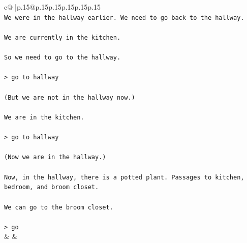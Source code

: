 \documentclass{article}
\begin{document}
{\begin{supertabular}{c@{$\;$}|p{.15\linewidth}@{}p{.15\linewidth}p{.15\linewidth}p{.15\linewidth}p{.15\linewidth}p{.15\linewidth}}
{{{\\ 
\texttt{We were in the hallway earlier. We need to go back to the hallway.} \\
\\ 
\texttt{We are currently in the kitchen.} \\
\\ 
\texttt{So we need to go to the hallway.} \\
\\ 
\texttt{> go to hallway} \\
\\ 
\texttt{(But we are not in the hallway now.)} \\
\\ 
\texttt{We are in the kitchen.} \\
\\ 
\texttt{> go to hallway} \\
\\ 
\texttt{(Now we are in the hallway.)} \\
\\ 
\texttt{Now, in the hallway, there is a potted plant. Passages to kitchen, bedroom, and broom closet.} \\
\\ 
\texttt{We can go to the broom closet.} \\
\\ 
\texttt{> go} \\
            }
        }
    }
    & & \\ \\


\end{supertabular}}
\end{document}
